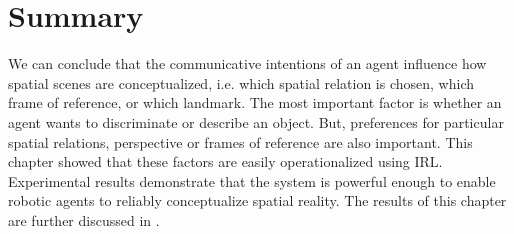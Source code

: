 \section{Summary}
We can conclude that the communicative intentions of an agent influence
how spatial scenes are conceptualized, i.e. which spatial relation is chosen, 
which frame of reference, or which landmark. The most important
factor is whether an agent wants to discriminate or describe an object.
But, preferences for particular spatial relations, perspective or frames of 
reference are also important. This chapter showed that these factors
are easily operationalized using IRL. Experimental results demonstrate that the system
is powerful enough to enable robotic agents to reliably conceptualize 
spatial reality. The results of this chapter are further discussed in \cite{pauw2010embodied,pauw2012embodied,spranger2012deviation}.



% 
% 
% 
